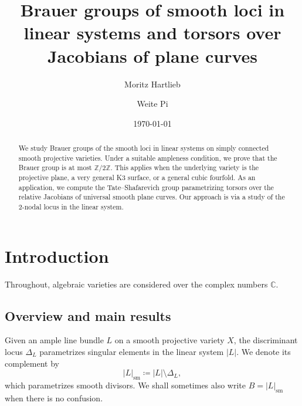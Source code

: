\documentclass[11pt]{amsart}
\theoremstyle{plain}
\theoremstyle{definition}
\theoremstyle{remark}
\begin{document}
\title[Brauer groups of smooth loci and torsors over relative Jacobians]{Brauer groups of smooth loci in linear systems and torsors over Jacobians of plane curves}
\date{\today}

\newcommand\blfootnote[1]{%
  \begingroup
  \renewcommand\thefootnote{}\footnote{#1}%
  \addtocounter{footnote}{-1}%
  \endgroup
}


\author[M.\ Hartlieb]{Moritz Hartlieb}
\address{Mathematisches Institut, Universität Bonn, Endenicher Allee 60, 53115
Bonn, Germany}


\author[W.\ Pi]{Weite Pi}
\address{Mathematisches Institut, Universität Bonn, Endenicher Allee 60, 53115
Bonn, Germany}


\begin{abstract}
    We study Brauer groups of the smooth loci in linear systems on simply connected smooth projective varieties. Under a suitable ampleness condition, we prove that the Brauer group is at most $\mathbb Z/2 \mathbb Z$. This applies when the underlying variety is the projective plane, a very general K3 surface, or a general cubic fourfold. As an application, we compute the Tate--Shafarevich group parametrizing torsors over the relative Jacobians of universal smooth plane curves. Our approach is via a study of the $2$-nodal locus in the linear system.
\end{abstract}

\maketitle

\setcounter{tocdepth}{1} 

\tableofcontents
\setcounter{section}{-1}

\section{Introduction}

Throughout, algebraic varieties are considered over the complex numbers $\mathbb C$.

\subsection{Overview and main results} Given an ample line bundle $L$ on a smooth projective variety $X$, the discriminant locus $\Delta_L$ parametrizes singular elements in the linear system $|L|$. We denote its complement by
\[
|L|_\mathrm{sm} \coloneq |L| \setminus \Delta_L,
\]
which parametrizes smooth divisors. We shall sometimes also write $B = |L|_\mathrm{sm}$ when there is no confusion.
\end{document}
